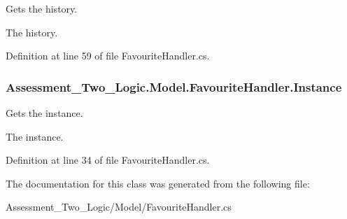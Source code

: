 Gets the history. 

The history.

Definition at line 59 of file FavouriteHandler.cs.

\hypertarget{class_assessment___two___logic_1_1_model_1_1_favourite_handler_a26cef8791fc8ec1e782f27ca800eef8b}{
\subsubsection[{Instance}]{ Assessment\_\-Two\_\-Logic.Model.FavouriteHandler.Instance}}
\label{class_assessment___two___logic_1_1_model_1_1_favourite_handler_a26cef8791fc8ec1e782f27ca800eef8b}


Gets the instance. 

The instance.

Definition at line 34 of file FavouriteHandler.cs.



The documentation for this class was generated from the following file:\begin{DoxyCompactItemize}
\item 
Assessment\_\-Two\_\-Logic/Model/FavouriteHandler.cs\end{DoxyCompactItemize}
